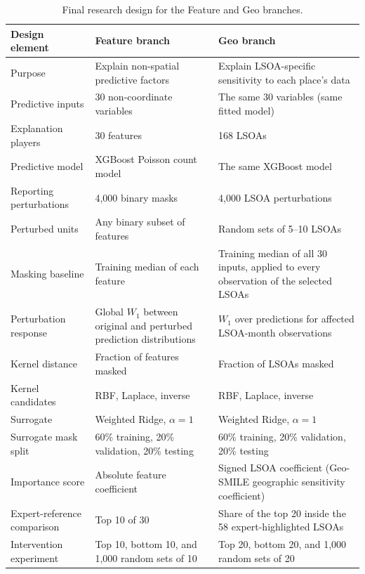 \begin{table}[H]
\centering
\caption{Final research design for the Feature and Geo branches.}
\label{tab:hull_research_design}
\small
\begin{tabularx}{\textwidth}{p{} X X}
\toprule
Design element & Feature branch & Geo branch \\
\midrule
Purpose & Explain non-spatial predictive factors & Explain LSOA-specific sensitivity to each place's data \\
Predictive inputs & 30 non-coordinate variables & The same 30 variables (same fitted model) \\
Explanation players & 30 features & 168 LSOAs \\
Predictive model & XGBoost Poisson count model & The same XGBoost model \\
Reporting perturbations & 4,000 binary masks & 4,000 LSOA perturbations \\
Perturbed units & Any binary subset of features & Random sets of 5--10 LSOAs \\
Masking baseline & Training median of each feature & Training median of all 30 inputs, applied to every observation of the selected LSOAs \\
Perturbation response & Global $W_1$ between original and perturbed prediction distributions & $W_1$ over predictions for affected LSOA-month observations \\
Kernel distance & Fraction of features masked & Fraction of LSOAs masked \\
Kernel candidates & RBF, Laplace, inverse & RBF, Laplace, inverse \\
Surrogate & Weighted Ridge, $\alpha=1$ & Weighted Ridge, $\alpha=1$ \\
Surrogate mask split & 60\% training, 20\% validation, 20\% testing & 60\% training, 20\% validation, 20\% testing \\
Importance score & Absolute feature coefficient & Signed LSOA coefficient (Geo-SMILE geographic sensitivity coefficient) \\
Expert-reference comparison & Top 10 of 30 & Share of the top 20 inside the 58 expert-highlighted LSOAs \\
Intervention experiment & Top 10, bottom 10, and 1,000 random sets of 10 & Top 20, bottom 20, and 1,000 random sets of 20 \\
\bottomrule
\end{tabularx}
\end{table}

